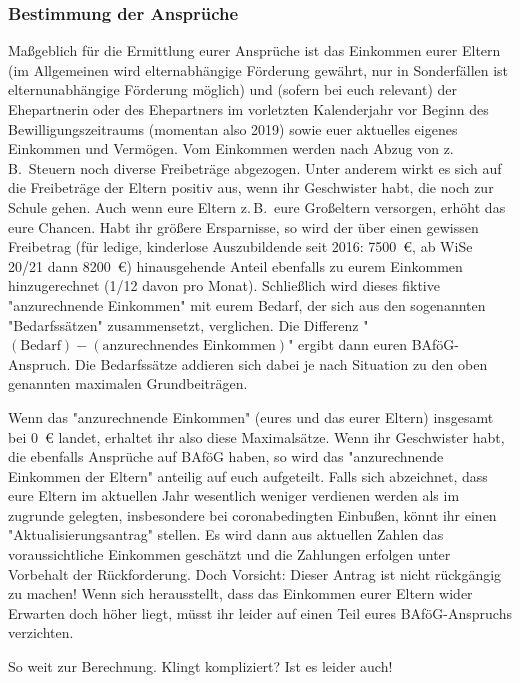 \begin{multicols*}{2}
\subsubsection{Bestimmung der Ansprüche}
Maßgeblich für die Ermittlung eurer Ansprüche ist das Einkommen eurer Eltern (im Allgemeinen wird elternabhängige Förderung gewährt, nur in Sonderfällen ist elternunabhängige Förderung möglich) und (sofern bei euch relevant) der Ehepartnerin oder des Ehepartners im vorletzten Kalenderjahr vor Beginn des Bewilligungszeitraums (momentan also 2019) sowie euer aktuelles eigenes Einkommen und Vermögen.
Vom Einkommen werden nach Abzug von z.\,B.\ Steuern noch diverse Freibeträge abgezogen.
Unter anderem wirkt es sich auf die Freibeträge der Eltern positiv aus, wenn ihr Geschwister habt, die noch zur Schule gehen.
Auch wenn eure Eltern z.\,B.\ eure Großeltern versorgen, erhöht das eure Chancen.
Habt ihr größere Ersparnisse, so wird der über einen gewissen Freibetrag (für ledige, kinderlose Auszubildende seit 2016: \SI{7500}{\euro}, ab WiSe 20/21 dann \SI{8200}{\euro}) hinausgehende Anteil ebenfalls zu eurem Einkommen hinzugerechnet (\num{1/12} davon pro Monat).
Schließlich wird dieses fiktive "anzurechnende Einkommen" mit eurem Bedarf, der sich aus den sogenannten "Bedarfssätzen" zusammensetzt, verglichen.
Die Differenz "$(\text{Bedarf}) - (\text{anzurechnendes Einkommen})$" ergibt dann euren BAföG-Anspruch.
Die Bedarfssätze addieren sich dabei je nach Situation zu den oben genannten maximalen Grundbeiträgen.

Wenn das "anzurechnende Einkommen" (eures und das eurer Eltern) insgesamt bei \SI{0}{\euro} landet, erhaltet ihr also diese Maximalsätze.
Wenn ihr Geschwister habt, die ebenfalls Ansprüche auf BAföG haben, so wird das "anzurechnende Einkommen der Eltern" anteilig auf euch aufgeteilt.
Falls sich abzeichnet, dass eure Eltern im aktuellen Jahr wesentlich weniger verdienen werden als im zugrunde gelegten, insbesondere bei coronabedingten Einbußen, könnt ihr einen "Aktualisierungsantrag" stellen.
Es wird dann aus aktuellen Zahlen das voraussichtliche Einkommen geschätzt und die Zahlungen erfolgen unter Vorbehalt der Rückforderung.
Doch Vorsicht: Dieser Antrag ist nicht rückgängig zu machen! Wenn sich herausstellt, dass das Einkommen eurer Eltern wider Erwarten doch höher liegt, müsst ihr leider auf einen Teil eures BAföG-Anspruchs verzichten.

So weit zur Berechnung.
Klingt kompliziert? Ist es leider auch!


\end{multicols*}
